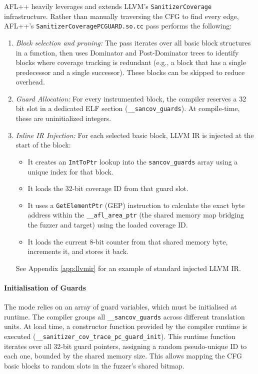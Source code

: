 AFL++ heavily leverages and extends LLVM's \texttt{SanitizerCoverage} infrastructure. Rather than manually traversing the CFG to find every edge, AFL++'s \texttt{SanitizerCoveragePCGUARD.so.cc} pass performs the following:
\begin{enumerate}
    \item \textit{Block selection and pruning:} The pass iterates over all basic block structures in a function, then uses Dominator and Post-Dominator trees to identify blocks where coverage tracking is redundant (e.g., a block that has a single predecessor and a single successor). These blocks can be skipped \cite{agrawal1994dominators} to reduce overhead.

    \item \textit{Guard Allocation:} For every instrumented block, the compiler reserves a 32 bit slot in a dedicated ELF section (\texttt{\_\_sancov\_guards}). At compile-time, these are uninitialized integers. 

    \item \textit{Inline IR Injection:} For each selected basic block, LLVM IR is injected at the start of the block:
    \begin{itemize}
        \item It creates an \texttt{IntToPtr} lookup into the \texttt{sancov\_guards} array using a unique index for that block.
        
        \item It loads the 32-bit coverage ID from that guard slot.
        
        \item It uses a \texttt{GetElementPtr} (GEP) instruction to calculate the exact byte address within the \texttt{\_\_afl\_area\_ptr} (the shared memory map bridging the fuzzer and target) using the loaded coverage ID.
        
        \item It loads the current 8-bit counter from that shared memory byte, increments it, and stores it back.
    \end{itemize}
    See Appendix \ref{app:llvmir} for an example of standard injected LLVM IR.
\end{enumerate}

\paragraph{Initialisation of Guards} The mode relies on an array of guard variables, which must be initialised at runtime. The compiler groups all \texttt{\_\_sancov\_guards} across different translation units. At load time, a constructor function provided by the compiler runtime is executed (\texttt{\_\_sanitizer\_cov\_trace\_pc\_guard\_init}). This runtime function iterates over all 32-bit guard pointers, assigning a random pseudo-unique ID to each one, bounded by the shared memory size. This allows mapping the CFG basic blocks to random slots in the fuzzer's shared bitmap.

